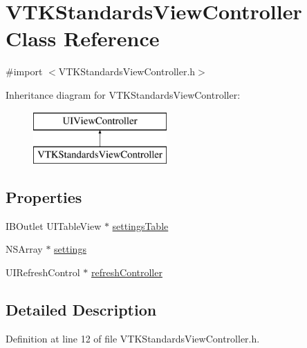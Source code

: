 \hypertarget{interface_v_t_k_standards_view_controller}{\section{V\+T\+K\+Standards\+View\+Controller Class Reference}
\label{interface_v_t_k_standards_view_controller}
}


{\ttfamily \#import $<$V\+T\+K\+Standards\+View\+Controller.\+h$>$}

Inheritance diagram for V\+T\+K\+Standards\+View\+Controller\+:\begin{figure}[H]
\begin{center}
\leavevmode
\includegraphics[height=2.000000cm]{interface_v_t_k_standards_view_controller}
\end{center}
\end{figure}
\subsection*{Properties}
\begin{DoxyCompactItemize}
\item 
I\+B\+Outlet U\+I\+Table\+View $\ast$ \hyperlink{interface_v_t_k_standards_view_controller_a80255bab4329e0cc55c67b891340f4e7}{settings\+Table}
\item 
N\+S\+Array $\ast$ \hyperlink{interface_v_t_k_standards_view_controller_a63a0f419f2bf9408c3c5d4f0b19b667d}{settings}
\item 
U\+I\+Refresh\+Control $\ast$ \hyperlink{interface_v_t_k_standards_view_controller_ab4a50d1f06688377ca2759fe6833c8da}{refresh\+Controller}
\end{DoxyCompactItemize}


\subsection{Detailed Description}


Definition at line 12 of file V\+T\+K\+Standards\+View\+Controller.\+h.



